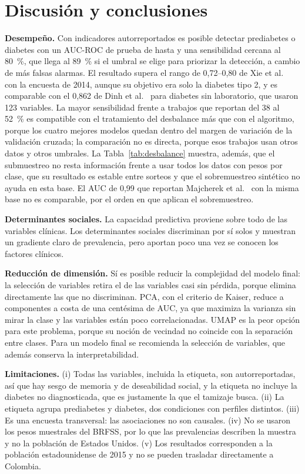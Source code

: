 \documentclass[journal]{IEEEtran}
\begin{document}
\section{Discusión y conclusiones}\label{sec:discusion}
\textbf{Desempeño.} Con indicadores autorreportados es posible detectar prediabetes o diabetes con un AUC-ROC de prueba de hasta \pruebaAucMLP{} y una sensibilidad cercana al 80~\%, que llega al 89~\% si el umbral se elige para priorizar la detección, a cambio de más falsas alarmas. El resultado supera el rango de 0,72--0,80 de Xie et al.~\cite{xie2019} con la encuesta de 2014, aunque su objetivo era solo la diabetes tipo 2, y es comparable con el 0,862 de Dinh et al.~\cite{dinh2019} para diabetes sin laboratorio, que usaron 123 variables. La mayor sensibilidad frente a trabajos que reportan del 38 al 52~\% es compatible con el tratamiento del desbalance más que con el algoritmo, porque los cuatro mejores modelos quedan dentro del margen de variación de la validación cruzada; la comparación no es directa, porque esos trabajos usan otros datos y otros umbrales. La Tabla~\ref{tab:desbalance} muestra, además, que el submuestreo no resta información frente a usar todos los datos con pesos por clase, que su resultado es estable entre sorteos y que el sobremuestreo sintético no ayuda en esta base. El AUC de 0,99 que reportan Majcherek et al.~\cite{majcherek2025} con la misma base no es comparable, por el orden en que aplican el sobremuestreo.

\textbf{Determinantes sociales.} La capacidad predictiva proviene sobre todo de las variables clínicas. Los determinantes sociales discriminan por sí solos y muestran un gradiente claro de prevalencia, pero aportan poco una vez se conocen los factores clínicos.

\textbf{Reducción de dimensión.} Sí es posible reducir la complejidad del modelo final: la selección de variables retira el \selRed{} de las variables casi sin pérdida, porque elimina directamente las que no discriminan. PCA, con el criterio de Kaiser, reduce a \pcaKaiser{} componentes a costa de una centésima de AUC, ya que maximiza la varianza sin mirar la clase y las variables están poco correlacionadas. UMAP es la peor opción para este problema, porque su noción de vecindad no coincide con la separación entre clases. Para un modelo final se recomienda la selección de variables, que además conserva la interpretabilidad.

\textbf{Limitaciones.} (i) Todas las variables, incluida la etiqueta, son autorreportadas, así que hay sesgo de memoria y de deseabilidad social, y la etiqueta no incluye la diabetes no diagnosticada, que es justamente la que el tamizaje busca. (ii) La etiqueta agrupa prediabetes y diabetes, dos condiciones con perfiles distintos. (iii) Es una encuesta transversal: las asociaciones no son causales. (iv) No se usaron los pesos muestrales del BRFSS, por lo que las prevalencias describen la muestra y no la población de Estados Unidos. (v) Los resultados corresponden a la población estadounidense de 2015 y no se pueden trasladar directamente a Colombia.
\end{document}
